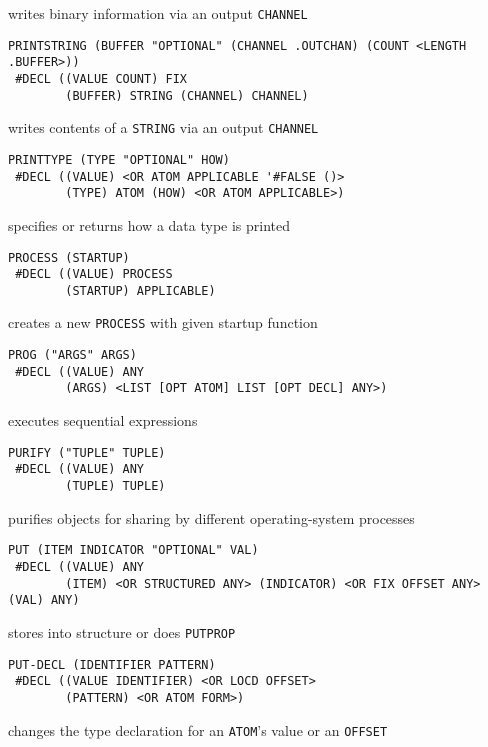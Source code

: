 \documentclass[a4paper,]{article}
\begin{document}
writes binary information via an output \texttt{CHANNEL}

\begin{verbatim}
PRINTSTRING (BUFFER "OPTIONAL" (CHANNEL .OUTCHAN) (COUNT <LENGTH .BUFFER>))
 #DECL ((VALUE COUNT) FIX
        (BUFFER) STRING (CHANNEL) CHANNEL)
\end{verbatim}

writes contents of a \texttt{STRING} via an output \texttt{CHANNEL}

\begin{verbatim}
PRINTTYPE (TYPE "OPTIONAL" HOW)
 #DECL ((VALUE) <OR ATOM APPLICABLE '#FALSE ()>
        (TYPE) ATOM (HOW) <OR ATOM APPLICABLE>)
\end{verbatim}

specifies or returns how a data type is printed

\begin{verbatim}
PROCESS (STARTUP)
 #DECL ((VALUE) PROCESS
        (STARTUP) APPLICABLE)
\end{verbatim}

creates a new \texttt{PROCESS} with given startup function

\begin{verbatim}
PROG ("ARGS" ARGS)
 #DECL ((VALUE) ANY
        (ARGS) <LIST [OPT ATOM] LIST [OPT DECL] ANY>)
\end{verbatim}

executes sequential expressions

\begin{verbatim}
PURIFY ("TUPLE" TUPLE)
 #DECL ((VALUE) ANY
        (TUPLE) TUPLE)
\end{verbatim}

purifies objects for sharing by different operating-system processes

\begin{verbatim}
PUT (ITEM INDICATOR "OPTIONAL" VAL)
 #DECL ((VALUE) ANY
        (ITEM) <OR STRUCTURED ANY> (INDICATOR) <OR FIX OFFSET ANY> (VAL) ANY)
\end{verbatim}

stores into structure or does \texttt{PUTPROP}

\begin{verbatim}
PUT-DECL (IDENTIFIER PATTERN)
 #DECL ((VALUE IDENTIFIER) <OR LOCD OFFSET>
        (PATTERN) <OR ATOM FORM>)
\end{verbatim}

changes the type declaration for an \texttt{ATOM}'s value or an \texttt{OFFSET}
\end{document}
